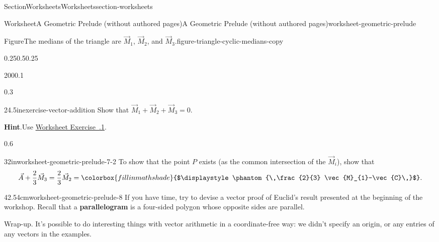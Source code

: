 \documentclass[twoside,10pt,]{article}
\newcommand{\blocktitlefont}{\relax}
\newcommand{\xreffont}{\relax}
\newcommand{\terminology}[1]{\textbf{#1}}
\newcommand{\fillinmath}[1]{\mathchoice{\colorbox{fillinmathshade}{$\displaystyle     \phantom{\,#1\,}$}}{\colorbox{fillinmathshade}{$\textstyle        \phantom{\,#1\,}$}}{\colorbox{fillinmathshade}{$\scriptstyle      \phantom{\,#1\,}$}}{\colorbox{fillinmathshade}{$\scriptscriptstyle\phantom{\,#1\,}$}}}
\numberwithin{equation}{section}
\begin{document}
\begin{sectionptx}{Section}{Worksheets}{}{Worksheets}{}{}{section-worksheets}
\begin{worksheet-subsection}{Worksheet}{A Geometric Prelude (without authored pages)}{}{A Geometric Prelude (without authored pages)}{}{}{worksheet-geometric-prelude}
\begin{figureptx}{Figure}{The medians of the triangle are \(\vec{M}_1\), \(\vec{M}_2\), and \(\vec{M}_3\).}{figure-triangle-cyclic-medians-copy}{}
\begin{image}{0.25}{0.5}{0.25}{}
{%
}%
\end{image}%
\tcblower
\end{figureptx}%
\begin{sidebyside}{2}{0}{0}{0.1}%
\begin{sbspanel}{0.3}%
\begin{divisionexercise}{2}{}{4.5in}{exercise-vector-addition}%
Show that \(\vec{M}_{1} + \vec{M}_{2} + \vec{M}_{3} = 0\).%
\par\smallskip%
\noindent\textbf{\blocktitlefont Hint}.\hypertarget{exercise-vector-addition-2}{}\quad{}Use \hyperlink{ex-cyclic}{Worksheet Exercise~{\xreffont 35.1.1}}.%
\end{divisionexercise}%
\end{sbspanel}%
\begin{sbspanel}{0.6}%
\begin{divisionexercise}{3}{}{2in}{worksheet-geometric-prelude-7-2}%
To show that the point \(P\) exists (as the common intersection of the \(\vec{M}_{i}\)), show that%
\begin{equation*}
\vec{A} + \frac{2}{3} \vec{M}_{3} = \frac{2}{3} \vec{M}_{2} = \fillinmath{\frac{2}{3} \vec{M}_{1}-\vec{C}}\text{.}
\end{equation*}
%
\end{divisionexercise}%
\end{sbspanel}%
\end{sidebyside}%
\begin{divisionexercise}{4}{}{2.54cm}{worksheet-geometric-prelude-8}%
If you have time, try to devise a vector proof of Euclid's result presented at the beginning of the workshop. Recall that a \terminology{parallelogram} is a four-sided polygon whose opposite sides are parallel.%
\end{divisionexercise}%
\begin{conclusion}{Wrap-up.}%
It's possible to do interesting things with vector arithmetic in a coordinate-free way: we didn't specify an origin, or any entries of any vectors in the examples.%

\end{conclusion}
\end{worksheet-subsection}
\end{sectionptx}
\end{document}
